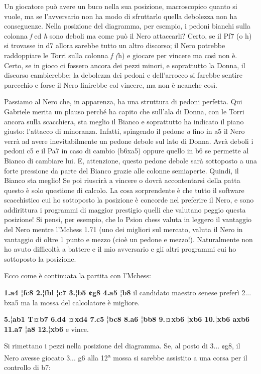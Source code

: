 Un giocatore può avere un buco nella sua posizione, macroscopico quanto
si vuole, ma se l'avversario non ha modo di sfruttarlo quella debolezza
non ha conseguenze. Nella posizione del diagramma, per esempio, i pedoni
bianchi sulla colonna \emph{f} ed \emph{h} sono deboli ma come può il
Nero attaccarli? Certo, se il Pf7 (o h) si trovasse in d7 allora sarebbe
tutto un altro discorso; il Nero potrebbe raddoppiare le Torri sulla
colonna \emph{f (}h) e giocare per vincere ma così non è. Certo, se in
gioco ci fossero ancora dei pezzi minori, e soprattutto la Donna, il
discorso cambierebbe; la debolezza dei pedoni e dell'arrocco si farebbe
sentire parecchio e forse il Nero finirebbe col vincere, ma non è
neanche così.

Passiamo al Nero che, in apparenza, ha una struttura di pedoni perfetta.
Qui Gabriele merita un plauso perché ha capito che sull'ala di Donna,
con le Torri ancora sulla scacchiera, sta meglio il Bianco e soprattutto
ha indicato il piano giusto: l'attacco di minoranza. Infatti, spingendo
il pedone \emph{a} fino in a5 il Nero verrà ad avere inevitabilmente un
pedone debole sul lato di Donna. Avrà deboli i pedoni c5 e il Pa7 in
caso di cambio (b6xa5) oppure quello in b6 se permette al Bianco di
cambiare lui. E, attenzione, questo pedone debole sarà sottoposto a una
forte pressione da parte del Bianco grazie alle colonne semiaperte.
Quindi, il Bianco sta meglio! Se poi riuscirà a vincere o dovrà
accontentarsi della patta questo è solo questione di calcolo. La cosa
sorprendente è che tutto il software scacchistico cui ho sottoposto la
posizione è concorde nel preferire il Nero, e sono addirittura i
programmi di maggior prestigio quelli che valutano peggio questa
posizione! Si pensi, per esempio, che lo Psion chess valuta in leggero
il vantaggio del Nero mentre l'Mchess 1.71 (uno dei migliori sul
mercato, valuta il Nero in vantaggio di oltre 1 punto e mezzo (cioè un
pedone e mezzo!). Naturalmente non ho avuto difficoltà a battere e il
mio avversario e gli altri programmi cui ho sottoposto la posizione.

Ecco come è continuata la partita con l'Mchess:

\textbf{1.a4 ¦fc8 2.¦fbl ¦c7 3.¦b5 ¢g8 4.a5 ¦b8} il candidato maestro
senese preferì 2... bxa5 ma la mossa del calcolatore è migliore.

\textbf{5.¦ab1 T¤b7 6.d4 ¤xd4 7.c5 ¦bc8 8.a6 ¦bb8 9.¤xb6 ¦xb6 10.¦xb6
axb6 11.a7 ¦a8 12.¦xb6} e vince.

Si rimettano i pezzi nella posizione del diagramma. Se, al posto di 3...
¢g8, il Nero avesse giocato 3... g6 alla 12\textsuperscript{a} mossa si
sarebbe assistito a una corsa per il controllo di b7:

